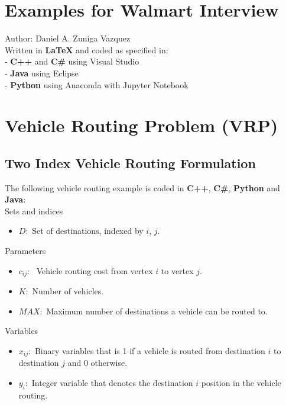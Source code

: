 \documentclass[10pt,bezier]{article}
\begin{document}
\section*{Examples for Walmart Interview}\label{Title}
Author: Daniel A. Zuniga Vazquez\\

\noindent Written in \textbf{LaTeX} and coded as specified in:\\
- {\color{blue}\textbf{C++}} and {\color{blue}\textbf{C\#}} using Visual Studio\\
- {\color{blue}\textbf{Java}} using Eclipse\\
- {\color{blue}\textbf{Python}} using Anaconda with Jupyter Notebook
\tableofcontents

\newpage
\section{Vehicle Routing Problem (VRP)}\label{section1}

\subsection{Two Index Vehicle Routing Formulation}\label{section1.1}
The following vehicle routing example is coded in {\color{blue}\textbf{C++}}, {\color{blue}\textbf{C\#}}, {\color{blue}\textbf{Python}} and {\color{blue}\textbf{Java}}:\\

\noindent Sets and indices
\begin{itemize}
  \item $D$:~Set of destinations, indexed by $i$, $j$.
\end{itemize}
Parameters
\begin{itemize}
    \item $c_{ij}$:~ Vehicle routing cost from vertex $i$ to vertex $j$.
    \item $K$:~Number of vehicles.
    \item $MAX$:~Maximum number of destinations a vehicle can be routed to.
\end{itemize}
Variables
\begin{itemize}
  \item $x_{ij}$:~Binary variables that is 1 if a vehicle is routed from destination $i$ to destination $j$ and 0 otherwise.
  \item $y_i$:~Integer variable that denotes the destination $i$ position in the vehicle routing.
\end{itemize}
\end{document}
